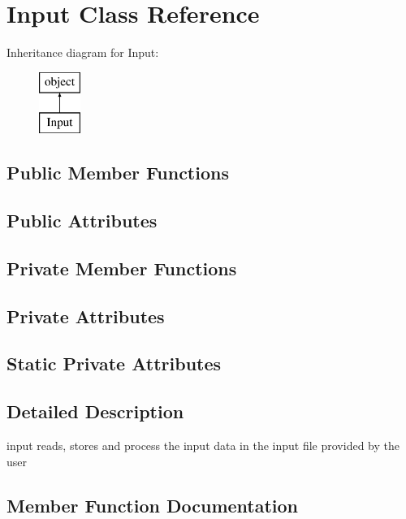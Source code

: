 \hypertarget{classopenbu_1_1input_1_1_input}{}\section{Input Class Reference}
\label{classopenbu_1_1input_1_1_input}
Inheritance diagram for Input\+:\begin{figure}[H]
\begin{center}
\leavevmode
\includegraphics[height=2.000000cm]{classopenbu_1_1input_1_1_input}
\end{center}
\end{figure}
\subsection*{Public Member Functions}
\subsection*{Public Attributes}
\subsection*{Private Member Functions}
\subsection*{Private Attributes}
\subsection*{Static Private Attributes}


\subsection{Detailed Description}
\begin{DoxyVerb}input reads, stores and process the input data in the input file provided by the user\end{DoxyVerb}
 

\subsection{Member Function Documentation}
\mbox{\label{classopenbu_1_1input_1_1_input_aec654cc5b1c47a58ce5dd1de926b8c17}} 
